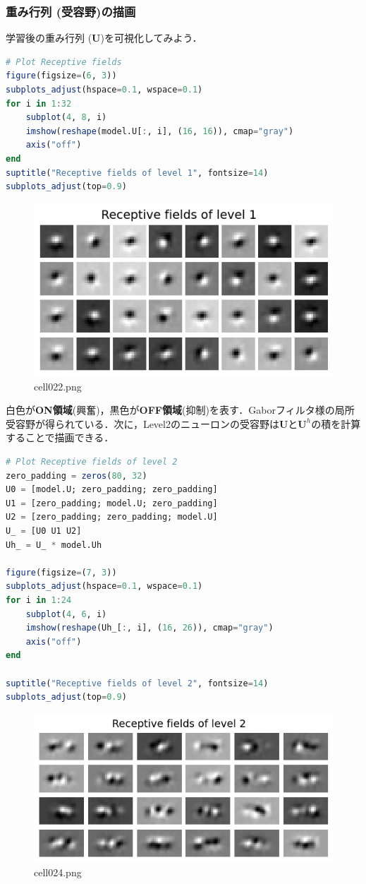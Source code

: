 \subsubsection{重み行列 (受容野)の描画}
学習後の重み行列 ($\mathbf{U}$)を可視化してみよう．
\begin{lstlisting}[language=julia]
# Plot Receptive fields
figure(figsize=(6, 3))
subplots_adjust(hspace=0.1, wspace=0.1)
for i in 1:32
    subplot(4, 8, i)
    imshow(reshape(model.U[:, i], (16, 16)), cmap="gray")
    axis("off")
end
suptitle("Receptive fields of level 1", fontsize=14)
subplots_adjust(top=0.9)
\end{lstlisting}
\begin{figure}[ht]
	\centering
	\includegraphics[scale=0.8, max width=\linewidth]{./fig/energy-based-model/predictive-coding/cell022.png}
	\caption{cell022.png}
	\label{cell022.png}
\end{figure}
白色が\textbf{ON領域}(興奮)，黒色が\textbf{OFF領域}(抑制)を表す．Gaborフィルタ様の局所受容野が得られている．次に，Level2のニューロンの受容野は$\mathbf{U}$と$\mathbf{U}^h$の積を計算することで描画できる．
\begin{lstlisting}[language=julia]
# Plot Receptive fields of level 2
zero_padding = zeros(80, 32)
U0 = [model.U; zero_padding; zero_padding]
U1 = [zero_padding; model.U; zero_padding]
U2 = [zero_padding; zero_padding; model.U]
U_ = [U0 U1 U2]
Uh_ = U_ * model.Uh 

figure(figsize=(7, 3))
subplots_adjust(hspace=0.1, wspace=0.1)
for i in 1:24
    subplot(4, 6, i)
    imshow(reshape(Uh_[:, i], (16, 26)), cmap="gray")
    axis("off")
end

suptitle("Receptive fields of level 2", fontsize=14)
subplots_adjust(top=0.9)
\end{lstlisting}
\begin{figure}[ht]
	\centering
	\includegraphics[scale=0.8, max width=\linewidth]{./fig/energy-based-model/predictive-coding/cell024.png}
	\caption{cell024.png}
	\label{cell024.png}
\end{figure}
